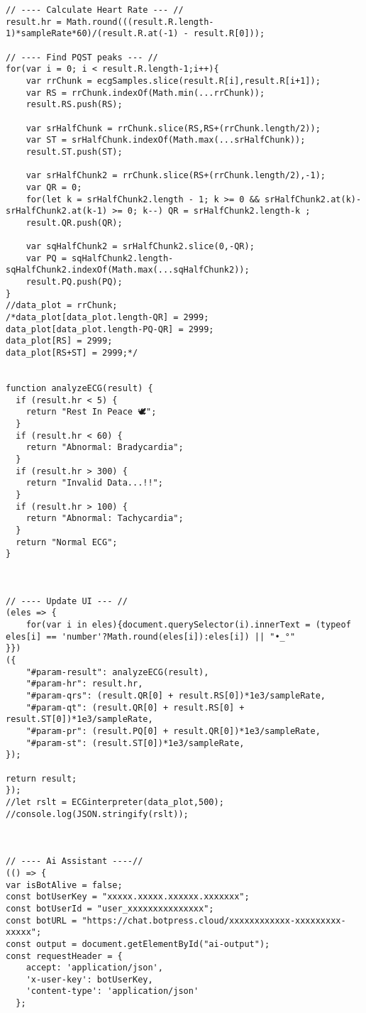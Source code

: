 \begin{lstlisting}[style=htmlcssjs]
// ---- Calculate Heart Rate --- //
result.hr = Math.round(((result.R.length-1)*sampleRate*60)/(result.R.at(-1) - result.R[0]));

// ---- Find PQST peaks --- //
for(var i = 0; i < result.R.length-1;i++){
    var rrChunk = ecgSamples.slice(result.R[i],result.R[i+1]);
    var RS = rrChunk.indexOf(Math.min(...rrChunk));
    result.RS.push(RS);
    
    var srHalfChunk = rrChunk.slice(RS,RS+(rrChunk.length/2));
    var ST = srHalfChunk.indexOf(Math.max(...srHalfChunk));
    result.ST.push(ST);
    
    var srHalfChunk2 = rrChunk.slice(RS+(rrChunk.length/2),-1);
    var QR = 0;
    for(let k = srHalfChunk2.length - 1; k >= 0 && srHalfChunk2.at(k)-srHalfChunk2.at(k-1) >= 0; k--) QR = srHalfChunk2.length-k ;
    result.QR.push(QR);
    
    var sqHalfChunk2 = srHalfChunk2.slice(0,-QR);
    var PQ = sqHalfChunk2.length-sqHalfChunk2.indexOf(Math.max(...sqHalfChunk2));
    result.PQ.push(PQ);
}
//data_plot = rrChunk;
/*data_plot[data_plot.length-QR] = 2999;
data_plot[data_plot.length-PQ-QR] = 2999;
data_plot[RS] = 2999;
data_plot[RS+ST] = 2999;*/


function analyzeECG(result) {
  if (result.hr < 5) {
    return "Rest In Peace 🕊️";
  }
  if (result.hr < 60) {
    return "Abnormal: Bradycardia";
  }
  if (result.hr > 300) {
    return "Invalid Data...!!";
  }
  if (result.hr > 100) {
    return "Abnormal: Tachycardia";
  }
  return "Normal ECG";
}



// ---- Update UI --- //
(eles => {
    for(var i in eles){document.querySelector(i).innerText = (typeof eles[i] == 'number'?Math.round(eles[i]):eles[i]) || "•_°"
}})
({
    "#param-result": analyzeECG(result),
    "#param-hr": result.hr,
    "#param-qrs": (result.QR[0] + result.RS[0])*1e3/sampleRate,
    "#param-qt": (result.QR[0] + result.RS[0] + result.ST[0])*1e3/sampleRate,
    "#param-pr": (result.PQ[0] + result.QR[0])*1e3/sampleRate,
    "#param-st": (result.ST[0])*1e3/sampleRate,
});

return result;
});
//let rslt = ECGinterpreter(data_plot,500);
//console.log(JSON.stringify(rslt));



// ---- Ai Assistant ----//
(() => {
var isBotAlive = false;
const botUserKey = "xxxxx.xxxxx.xxxxxx.xxxxxxx";
const botUserId = "user_xxxxxxxxxxxxxxx";
const botURL = "https://chat.botpress.cloud/xxxxxxxxxxxx-xxxxxxxxx-xxxxx";
const output = document.getElementById("ai-output");
const requestHeader = {
    accept: 'application/json',
    'x-user-key': botUserKey,
    'content-type': 'application/json'
  };


\end{lstlisting}
